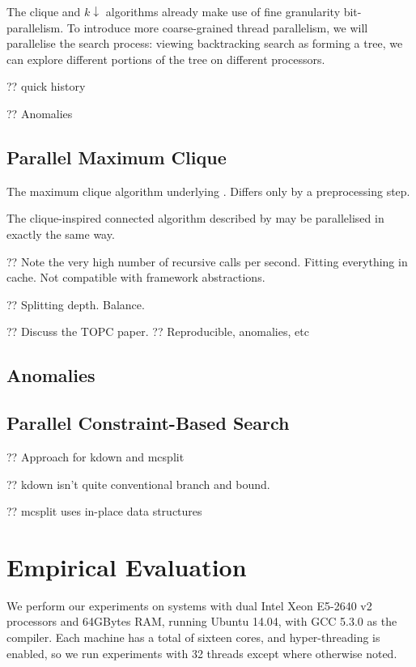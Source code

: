 \documentclass[sigconf]{acmart}
\begin{document}
The clique and $k{\downarrow}$ algorithms already make use of fine granularity bit-parallelism. To
introduce more coarse-grained thread parallelism, we will parallelise the search process: viewing
backtracking search as forming a tree, we can explore different portions of the tree on different
processors.

?? quick history

?? Anomalies

\subsection{Parallel Maximum Clique}

The maximum clique algorithm underlying . Differs only by a preprocessing step.

The clique-inspired connected algorithm described by \citet{} may be parallelised in exactly the
same way.

?? Note the very high number of recursive calls per second. Fitting everything in cache. Not
compatible with framework abstractions.

?? Splitting depth. Balance.

?? Discuss the TOPC paper.  ?? Reproducible, anomalies, etc

\subsection{Anomalies}

\subsection{Parallel Constraint-Based Search}

?? Approach for kdown and mcsplit

?? kdown isn't quite conventional branch and bound.

?? mcsplit uses in-place data structures

\section{Empirical Evaluation}

We perform our experiments on systems with dual Intel Xeon E5-2640 v2 processors and 64GBytes RAM,
running Ubuntu 14.04, with GCC 5.3.0 as the compiler. Each machine has a total of sixteen cores, and
hyper-threading is enabled, so we run experiments with 32 threads except where otherwise noted.
\end{document}
